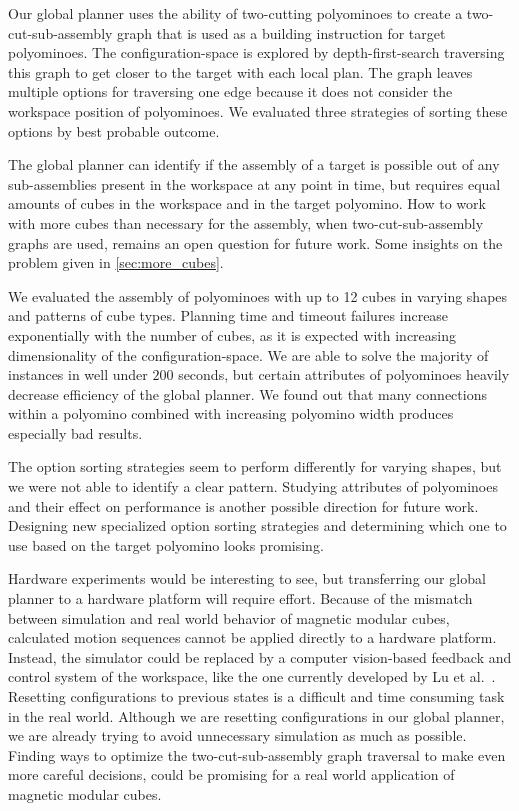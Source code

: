 Our global planner uses the ability of two-cutting polyominoes to create a two-cut-sub-assembly graph that is used as a building instruction for target polyominoes.
The configuration-space is explored by depth-first-search traversing this graph to get closer to the target with each local plan.
The graph leaves multiple options for traversing one edge because it does not consider the workspace position of polyominoes. 
We evaluated three strategies of sorting these options by best probable outcome.

\newpage

The global planner can identify if the assembly of a target is possible out of any sub-assemblies present in the workspace at any point in time, but requires equal amounts of cubes in the workspace and in the target polyomino.
How to work with more cubes than necessary for the assembly, when two-cut-sub-assembly graphs are used, remains an open question for future work.
Some insights on the problem given in \autoref{sec:more_cubes}.

We evaluated the assembly of polyominoes with up to 12 cubes in varying shapes and patterns of cube types.
Planning time and timeout failures increase exponentially with the number of cubes, as it is expected with increasing dimensionality of the configuration-space.
We are able to solve the majority of instances in well under $200$ seconds, but certain attributes of polyominoes heavily decrease efficiency of the global planner.
We found out that many connections within a polyomino combined with increasing polyomino width produces especially bad results.

The option sorting strategies seem to perform differently for varying shapes, but we were not able to identify a clear pattern.
Studying attributes of polyominoes and their effect on performance is another possible direction for future work.
Designing new specialized option sorting strategies and determining which one to use based on the target polyomino looks promising. 

Hardware experiments would be interesting to see, but transferring our global planner to a hardware platform will require effort.
Because of the mismatch between simulation and real world behavior of magnetic modular cubes, calculated motion sequences cannot be applied directly to a hardware platform.
Instead, the simulator could be replaced by a computer vision-based feedback and control system of the workspace, like the one currently developed by Lu et al.\ \cite{Lu2023}.
Resetting configurations to previous states is a difficult and time consuming task in the real world.
Although we are resetting configurations in our global planner, we are already trying to avoid unnecessary simulation as much as possible.
Finding ways to optimize the two-cut-sub-assembly graph traversal to make even more careful decisions, could be promising for a real world application of magnetic modular cubes.






